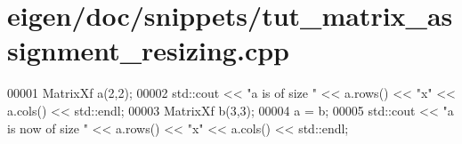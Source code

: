 \hypertarget{eigen_2doc_2snippets_2tut__matrix__assignment__resizing_8cpp_source}{}\section{eigen/doc/snippets/tut\+\_\+matrix\+\_\+assignment\+\_\+resizing.cpp}
\label{eigen_2doc_2snippets_2tut__matrix__assignment__resizing_8cpp_source}

\begin{DoxyCode}
00001 MatrixXf a(2,2);
00002 std::cout << \textcolor{stringliteral}{"a is of size "} << a.rows() << \textcolor{stringliteral}{"x"} << a.cols() << std::endl;
00003 MatrixXf b(3,3);
00004 a = b;
00005 std::cout << \textcolor{stringliteral}{"a is now of size "} << a.rows() << \textcolor{stringliteral}{"x"} << a.cols() << std::endl;
\end{DoxyCode}
